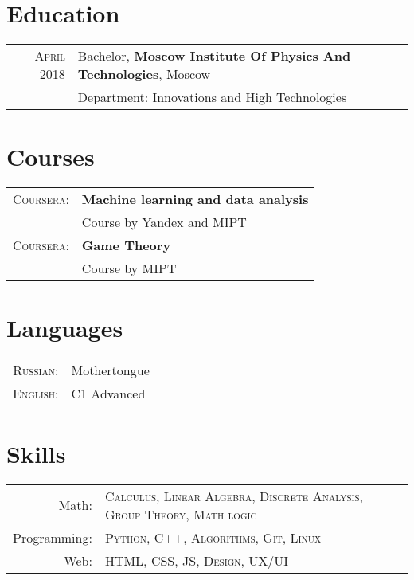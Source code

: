 \documentclass[a4paper,10pt]{article}
\begin{document}
\section{Education}
\begin{tabular}{rl}	
 \textsc{April 2018}  & Bachelor, \textbf{Moscow Institute Of Physics And Technologies}, Moscow\\
& \small\emph{}Department: Innovations and High Technologies\\
\end{tabular}

\section{Courses}
\begin{tabular}{rl}
 \textsc{Coursera:}  & \textbf{Machine learning and data analysis}\\
& \small\emph{}Course by Yandex and MIPT\\
 \textsc{Coursera:}  & \textbf{Game Theory}\\
& \small\emph{}Course by MIPT\\
\end{tabular}

\section{Languages}
\begin{tabular}{rl}
 \textsc{Russian:}&Mothertongue\\
\textsc{English:}&C1 Advanced\\
\end{tabular}

\section{Skills}
\begin{tabular}{rl}
 Math:& \textsc{Calculus, Linear Algebra, Discrete Analysis, Group Theory, Math logic} \\
Programming:& \textsc{Python, C++, Algorithms, Git, Linux}\\
Web:& \textsc{HTML, CSS,  JS, Design, UX/UI}\\
\end{tabular}
\end{document}
